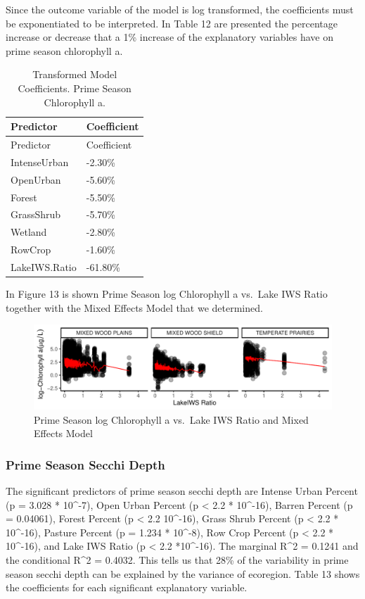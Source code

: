 \documentclass[12pt,]{article}
\begin{document}
Since the outcome variable of the model is log transformed, the
coefficients must be exponentiated to be interpreted. In Table 12 are
presented the percentage increase or decrease that a 1\% increase of the
explanatory variables have on prime season chlorophyll a.

\newpage

\begin{longtable}[]{@{}ll@{}}
\caption{Transformed Model Coefficients. Prime Season Chlorophyll
a.}\tabularnewline
\toprule
Predictor & Coefficient\tabularnewline
\midrule
\endfirsthead
\toprule
Predictor & Coefficient\tabularnewline
\midrule
\endhead
IntenseUrban & -2.30\%\tabularnewline
OpenUrban & -5.60\%\tabularnewline
Forest & -5.50\%\tabularnewline
GrassShrub & -5.70\%\tabularnewline
Wetland & -2.80\%\tabularnewline
RowCrop & -1.60\%\tabularnewline
LakeIWS.Ratio & -61.80\%\tabularnewline
\bottomrule
\end{longtable}

In Figure 13 is shown Prime Season log Chlorophyll a vs.~Lake IWS Ratio
together with the Mixed Effects Model that we determined.

\begin{figure}
\centering
\includegraphics{Bollt_Greif_Raby_Roth_Project_Final_files/figure-latex/unnamed-chunk-25-1.pdf}
\caption{Prime Season log Chlorophyll a vs.~Lake IWS Ratio and Mixed
Effects Model}
\end{figure}

\hypertarget{prime-season-secchi-depth}{%
\subsubsection{Prime Season Secchi
Depth}\label{prime-season-secchi-depth}}

The significant predictors of prime season secchi depth are Intense
Urban Percent (p = 3.028 * 10\^{}-7), Open Urban Percent (p \textless{}
2.2 * 10\^{}-16), Barren Percent (p = 0.04061), Forest Percent (p
\textless{} 2.2 10\^{}-16), Grass Shrub Percent (p \textless{} 2.2 *
10\^{}-16), Pasture Percent (p = 1.234 * 10\^{}-8), Row Crop Percent (p
\textless{} 2.2 * 10\^{}-16), and Lake IWS Ratio (p \textless{} 2.2
*10\^{}-16). The marginal R\^{}2 = 0.1241 and the conditional R\^{}2 =
0.4032. This tells us that 28\% of the variability in prime season
secchi depth can be explained by the variance of ecoregion. Table 13
shows the coefficients for each significant explanatory variable.
\end{document}
